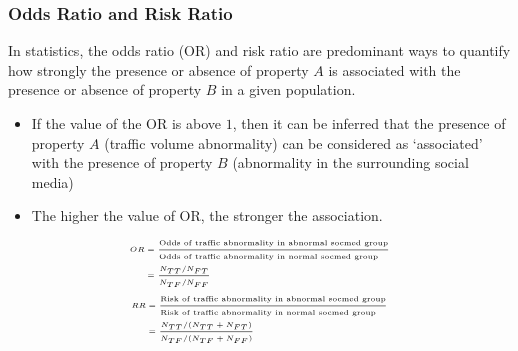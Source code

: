 \begin{frame}
    \frametitle{Odds Ratio and Risk Ratio}
    \small In statistics, the odds ratio (OR) and risk ratio \cite{cornfield1951method,mosteller1968association} are predominant ways to quantify how strongly the presence or absence of property $A$ is associated with the presence or absence of property $B$ in a given population.
    \begin{itemize} \tiny
        \item If the value of the OR is above $1$, then it can be inferred that the presence of property $A$ (traffic volume abnormality) can be considered as `associated' with the presence of property $B$ (abnormality in the surrounding social media)
        \item The higher the value of OR, the stronger the association.
    \end{itemize}
    \begin{equation}
        \tiny
        \begin{split}
        OR &= \frac{\text{Odds of traffic abnormality in abnormal socmed group}}{\text{Odds of traffic abnormality in normal socmed group}\hfill} \\
           &= \frac{N_{TT} / N_{FT}}{N_{TF} / N_{FF}}
        \end{split}
        \label{eq:od}
    \end{equation}
    \begin{equation}
        \tiny
        \begin{split}
        RR &=\frac{\text{Risk of traffic abnormality in abnormal socmed group}}{\text{Risk of traffic abnormality in normal socmed group}\hfill} \\
           &= \frac{N_{TT} / (N_{TT} + N_{FT})}{N_{TF} / (N_{TF} + N_{FF})}
        \end{split}
        \label{eq:rr}
    \end{equation}
\end{frame}

